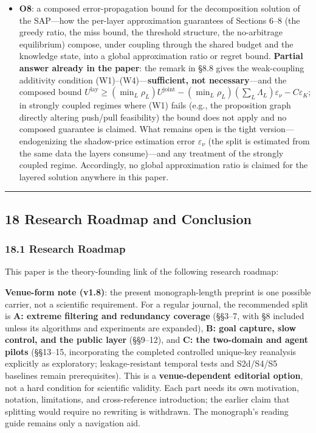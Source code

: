 \documentclass[
  11pt]{article}
\begin{document}
\begin{itemize}
\item
  \textbf{O8}: a composed error-propagation bound for the decomposition
  solution of the SAP---how the per-layer approximation guarantees of
  Sections 6--8 (the greedy ratio, the miss bound, the threshold
  structure, the no-arbitrage equilibrium) compose, under coupling
  through the shared budget and the knowledge state, into a global
  approximation ratio or regret bound. \textbf{Partial answer already in
  the paper}: the remark in §8.8 gives the weak-coupling additivity
  condition (W1)--(W4)---\textbf{sufficient, not necessary}---and the
  composed bound
  \(U^{\mathrm{lay}} \ge (\min_L \rho_L)U^{\mathrm{joint}} - (\min_L \rho_L)(\sum_L \Lambda_L)\varepsilon_\nu - C\varepsilon_K\);
  in strongly coupled regimes where (W1) fails (e.g., the proposition
  graph directly altering push/pull feasibility) the bound does not
  apply and no composed guarantee is claimed. What remains open is the
  tight version---endogenizing the shadow-price estimation error
  \(\varepsilon_\nu\) (the split is estimated from the same data the
  layers consume)---and any treatment of the strongly coupled regime.
  Accordingly, no global approximation ratio is claimed for the layered
  solution anywhere in this paper.
\end{itemize}

\begin{center}\rule{0.5\linewidth}{0.5pt}\end{center}

\subsection{18 Research Roadmap and
Conclusion}\label{research-roadmap-and-conclusion}

\subsubsection{18.1 Research Roadmap}\label{research-roadmap}

This paper is the theory-founding link of the following research
roadmap:

\textbf{Venue-form note (v1.8)}: the present monograph-length preprint
is one possible carrier, not a scientific requirement. For a regular
journal, the recommended split is \textbf{A: extreme filtering and
redundancy coverage} (§§3--7, with §8 included unless its algorithms and
experiments are expanded), \textbf{B: goal capture, slow control, and
the public layer} (§§9--12), and \textbf{C: the two-domain and agent
pilots} (§§13--15, incorporating the completed controlled unique-key
reanalysis explicitly as exploratory; leakage-resistant temporal tests
and S2d/S4/S5 baselines remain prerequisites). This is a
\textbf{venue-dependent editorial option}, not a hard condition for
scientific validity. Each part needs its own motivation, notation,
limitations, and cross-reference introduction; the earlier claim that
splitting would require no rewriting is withdrawn. The monograph's
reading guide remains only a navigation aid.
\end{document}
